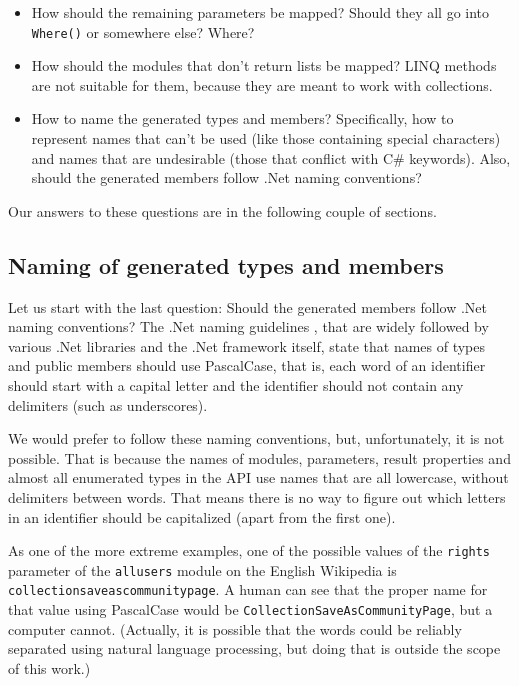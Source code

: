 \begin{itemize}
\item How should the remaining parameters be mapped?
Should they all go into \lstinline{Where()} or somewhere else? Where?
\item How should the modules that don't return lists be mapped?
LINQ methods are not suitable for them, because they are meant to work with collections.
\item How to name the generated types and members?
Specifically, how to represent names that can't be used (like those containing special characters)
and names that are undesirable (those that conflict with C\# keywords).
Also, should the generated members follow .Net naming conventions?
\end{itemize}

Our answers to these questions are in the following couple of sections.

\subsection{Naming of generated types and members}

Let us start with the last question: Should the generated members follow .Net naming conventions?
The .Net naming guidelines \cite{guidelines-for-names},
that are widely followed by various .Net libraries and the .Net framework itself,
state that names of types and public members should use PascalCase,
that is, each word of an identifier should start with a capital letter
and the identifier should not contain any delimiters (such as underscores).

We would prefer to follow these naming conventions, but, unfortunately, it is not possible.
That is because the names of modules, parameters, result properties and almost all enumerated types in the API
use names that are all lowercase, without delimiters between words.
That means there is no way to figure out which letters in an identifier should be capitalized
(apart from the first one).

As one of the more extreme examples,
one of the possible values of the \texttt{rights} parameter
of the \texttt{allusers} module on the English Wikipedia is \texttt{collection\-save\-as\-community\-page}.
A human can see that the proper name for that value using PascalCase would be \lstinline{CollectionSaveAsCommunityPage},
but a computer cannot.
(Actually, it is possible that the words could be reliably separated using natural language processing,
but doing that is outside the scope of this work.)


